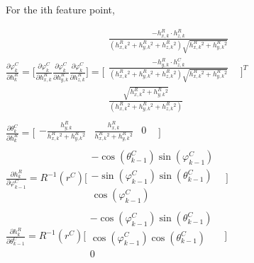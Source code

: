 For the ith feature point,

$\frac{\partial \varphi _{k}^{C}}{\partial h_{k}^{R}}=\lbrack 
\frac{\partial \varphi _{k}^{C}}{\partial h_{x,k}^{R}} \frac{\partial 
\varphi _{ k}^{C}}{\partial h_{y,k}^{R}} \frac{\partial \varphi _{ 
k}^{C}}{\partial h_{z,k}^{R}}\rbrack =\lbrack \begin{matrix}
\frac{-h_{x,k}^{R}\cdot 
h_{z,k}^{R}}{(h_{x,k}^{R}^{2}+h_{y,k}^{R}^{2}+h_{z,k}^{R}^{2})\sqrt{h_{x,k}^{R}^{2}+h_{y,k}^{R}^{2}}} 
& \\
\frac{-h_{y,k}^{R}\cdot 
h_{z,k}^{C}}{(h_{x,k}^{R}^{2}+h_{y,k}^{R}^{2}+h_{z,k}^{R}^{2})\sqrt{h_{x,k}^{R}^{2}+h_{y,k}^{R}^{2}}} 
& \\

\frac{\sqrt{h_{x,k}^{R}^{2}+h_{y,k}^{R}^{2}}}{(h_{x,k}^{R}^{2}+h_{y,k}^{R}^{2}+h_{z,k}^{R}^{2})} 
& \\
\end{matrix}
\rbrack ^{T}$\\


$\frac{\partial \theta _{k}^{C}}{\partial h_{k}^{R}}=\lbrack 
\begin{matrix}
-\frac{h_{y,k}^{R}}{h_{x,k}^{R}^{2}+h_{y,k}^{R}^{2}} & 
\frac{h_{x,k}^{R}}{h_{x,k}^{R}^{2}+h_{y,k}^{R}^{2}} & 0 & \\
\end{matrix}
\rbrack $\\


$\frac{\partial h_{k}^{R}}{\partial \varphi _{k-1}^{C}}=R^{-1}(r^{C}) 
\lbrack \begin{matrix}
-\cos (\theta _{k-1}^{C})\sin (\varphi _{k-1}^{C}) & \\
-\sin (\varphi _{k-1}^{C})\sin (\theta _{k-1}^{C}) & \\
\cos (\varphi _{k-1}^{C}) & \\
\end{matrix}
\rbrack $\\


$\frac{\partial h_{k}^{R}}{\partial \theta _{k-1}^{C}}=R^{-1}(r^{C}) 
\lbrack \begin{matrix}
-\cos (\varphi _{k-1}^{C})\sin (\theta _{k-1}^{C}) & \\
\cos (\varphi _{k-1}^{C})\cos (\theta _{k-1}^{C}) & \\
0 & \\
\end{matrix}
\rbrack $\\
